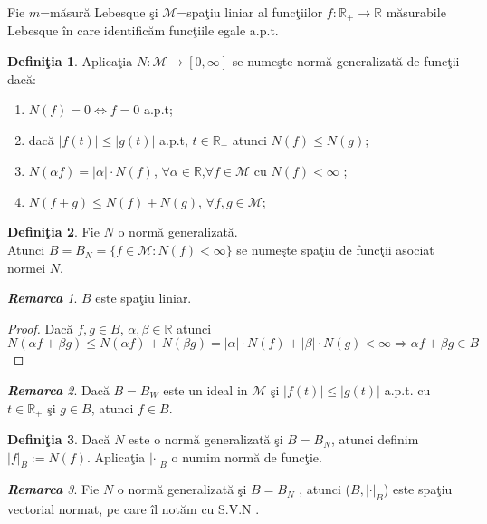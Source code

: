 \documentclass[ a4paper, 12pt]{report}
\theoremstyle{definition}
\newtheorem{definition}{\bf Defini\c tia}[section]
\theoremstyle{remark}
\newtheorem{remarc}{\bf Remarca}[section]
\numberwithin{equation}{section}
\begin{document}
Fie $m$=m\u asur\u a Lebesque \c si $\mathcal{M}$=spa\c tiu liniar al func\c tiilor $f:\mathbb{R}_+\rightarrow \mathbb{R}$     m\u asurabile Lebesque \^in care identific\u am func\c tiile egale a.p.t.\\
\begin{definition}
Aplica\c tia $N:\mathcal{M}\rightarrow[0,\infty]$ se nume\c ste norm\u a generalizat\u a de func\c tii dac\u a:
\begin{enumerate}
\item $N(f)=0\Leftrightarrow f=0$ a.p.t;
\item dac\u a $ \lvert f(t) \rvert\leqslant \lvert g(t) \rvert$ a.p.t, $t\in \mathbb{R}_+$ atunci $N(f)\leqslant N(g)$;
\item $N(\alpha f)=\lvert \alpha \rvert \cdot N(f)$, $\forall \alpha\in \mathbb{R}$,$\forall  f\in \mathcal{M}$ cu $N(f)<\infty$ ;
\item $N(f+g)\leqslant N(f)+N(g) $, $\forall f,g\in \mathcal{M}$;
\end{enumerate}
\end{definition}
\begin{definition}
Fie $N$ o norm\u a generalizat\u a.\\Atunci $B=B_N=\{f \in \mathcal{M}:N(f)<\infty\}$ se nume\c ste spa\c tiu de func\c tii asociat normei $N$.
\end{definition}
\begin{remarc}
$B$  este spa\c tiu liniar.
\begin{proof}
Dac\u a $f,g\in B$, $\alpha,\beta \in \mathbb{R}$ atunci $N(\alpha f + \beta g)\leqslant N(\alpha f)+N(\beta g)=\lvert \alpha \rvert \cdot N(f)+\lvert \beta \rvert \cdot N(g)<\infty \Rightarrow \alpha f + \beta g \in B$
\end{proof}
\end{remarc}
\begin{remarc}
 Dac\u a $B=B_W$ este un ideal in $\mathcal{M}$  \c si $\lvert f(t) \rvert \leqslant \lvert g(t) \rvert$ a.p.t. cu $t \in \mathbb{R}_+$ \c si $g \in B$, atunci $f \in B$.
\end{remarc}
\begin{definition}
Dac\u a $N$ este o norm\u a generalizat\u a \c si $B=B_N$, atunci  definim $\lvert  f \rvert_B := N(f)$. Aplica\c tia $\lvert  \cdot  \rvert _B$ o numim norm\u a de func\c tie. 
\end{definition}
\begin{remarc}
Fie $N$ o norm\u a generalizat\u a \c si $B=B_N$ , atunci ($B,\lvert \cdot \rvert_B$) este spa\c tiu vectorial normat, pe care \^il not\u am cu S.V.N .
\end{remarc}
\end{document}
